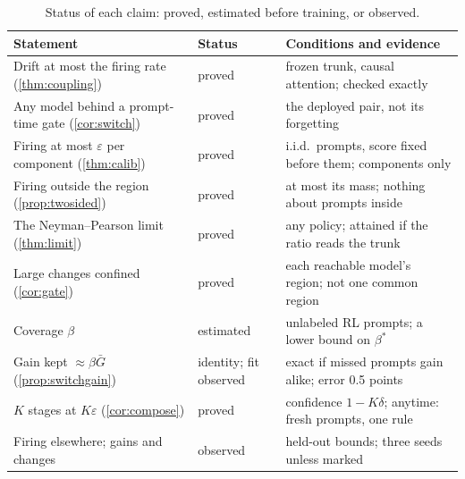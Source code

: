 \documentclass{article}
\theoremstyle{plain}
\theoremstyle{definition}
\theoremstyle{remark}
\begin{document}
\begin{table}[t]
\centering
\footnotesize
\setlength{\tabcolsep}{2.5pt}
\caption{Status of each claim: proved, estimated before training, or observed.}
\label{tab:status}
\begin{tabular}{l l l}
\toprule
Statement & Status & Conditions and evidence \\
\midrule
Drift at most the firing rate (\cref{thm:coupling}) & proved & frozen trunk, causal attention; checked exactly \\
Any model behind a prompt-time gate (\cref{cor:switch}) & proved & the deployed pair, not its forgetting \\
Firing at most $\varepsilon$ per component (\cref{thm:calib}) & proved & i.i.d.\ prompts, score fixed before them; components only \\
Firing outside the region (\cref{prop:twosided}) & proved & at most its mass; nothing about prompts inside \\
The Neyman--Pearson limit (\cref{thm:limit}) & proved & any policy; attained if the ratio reads the trunk \\
Large changes confined (\cref{cor:gate}) & proved & each reachable model's region; not one common region \\
Coverage $\beta$ & estimated & unlabeled RL prompts; a lower bound on $\beta^\ast$ \\
Gain kept $\approx\beta\bar G$ (\cref{prop:switchgain}) & identity; fit observed & exact if missed prompts gain alike; error 0.5 points \\
$K$ stages at $K\varepsilon$ (\cref{cor:compose}) & proved & confidence $1-K\delta$; anytime: fresh prompts, one rule \\
Firing elsewhere; gains and changes & observed & held-out bounds; three seeds unless marked \\
\bottomrule
\end{tabular}
\end{table}
\end{document}

